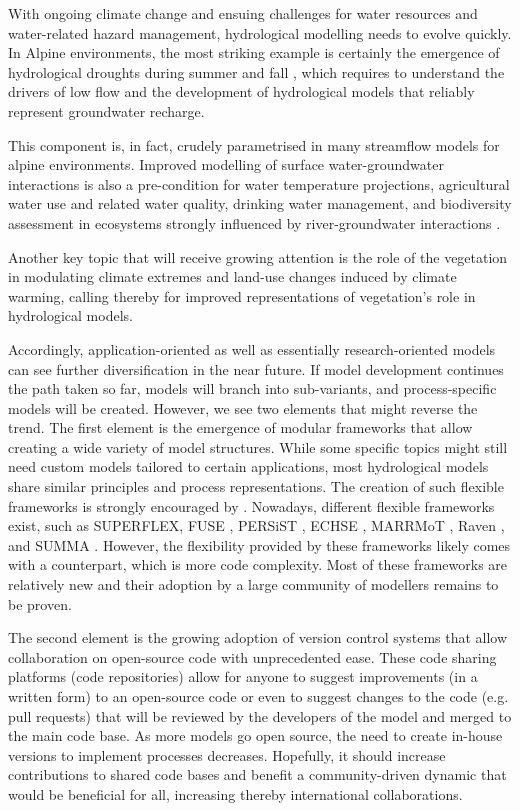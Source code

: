 \documentclass[10pt,a4paper]{article}
\begin{document}
With ongoing climate change and ensuing challenges for water resources
and water-related hazard management, hydrological modelling needs to
evolve quickly. In Alpine environments, the most striking example is
certainly the emergence of hydrological droughts \citep{Van_Loon_2015}
during summer and fall \citep{brunner2019drought,Rigling2020}, which requires to understand
the drivers of low flow \citep{Arnoux_2020} and the development of
hydrological models that reliably represent groundwater recharge.

This component is, in fact, crudely parametrised in many streamflow
models for alpine environments. Improved modelling of surface
water-groundwater interactions is also a pre-condition for water
temperature projections, agricultural water use and related water
quality, drinking water management, and biodiversity assessment in
ecosystems strongly influenced by river-groundwater
interactions \citep{Brunner_2017}. 

Another key topic that will receive growing attention is the role of the
vegetation in modulating climate extremes \citep{Mastrotheodoros_2020} and
land-use changes induced by climate warming, calling thereby for
improved representations of vegetation's role in hydrological models.

Accordingly, application-oriented as well as essentially
research-oriented models can see further diversification in the near
future. If model development continues the path taken so far, models
will branch into sub-variants, and process-specific models will be
created. However, we see two elements that might reverse the trend. The
first element is the emergence of modular frameworks that allow creating
a wide variety of model structures. While some specific topics might
still need custom models tailored to certain applications, most
hydrological models share similar principles and process
representations. The creation of such flexible frameworks is strongly
encouraged by \citet{Clark2011a}. Nowadays, different flexible
frameworks exist, such as SUPERFLEX, FUSE \citep{Clark2008},
PERSiST \citep{Futter2014}, ECHSE \citep{Kneis2015},
MARRMoT \citep{Knoben2019}, Raven \citep{Craig2020}, and
SUMMA \citep{Clark2015}. {However, the flexibility provided by these
frameworks likely comes with a counterpart, which is more code
complexity. Most of these frameworks are relatively new and their
adoption by a large community of modellers remains to be proven}. 

The second element is the growing adoption of version control systems
that allow collaboration on open-source code with unprecedented ease.
These code sharing platforms (code repositories) allow for anyone to
suggest improvements (in a written form) to an open-source code or even
to suggest changes to the code (e.g. pull requests) that will be
reviewed by the developers of the model and merged to the main code
base. As more models go open source, the need to create in-house
versions to implement processes decreases. Hopefully, it should increase
contributions to shared code bases and benefit a community-driven
dynamic that would be beneficial for all, increasing thereby
international collaborations.
\end{document}
